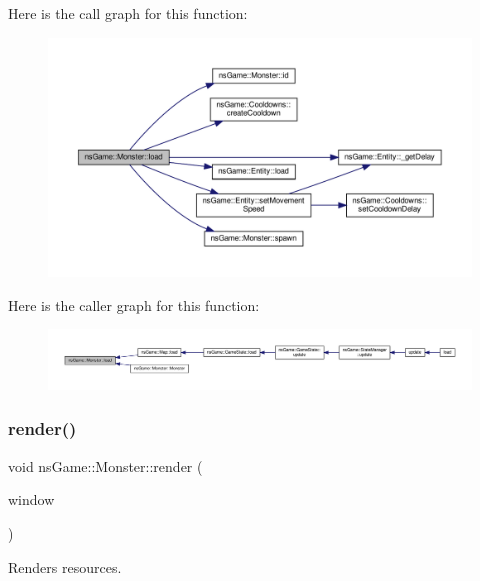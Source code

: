 Here is the call graph for this function\+:\nopagebreak
\begin{figure}[H]
\begin{center}
\leavevmode
\includegraphics[width=350pt]{classns_game_1_1_monster_a6b81ba26c3e8fae426e719be2acc4e4e_cgraph}
\end{center}
\end{figure}
Here is the caller graph for this function\+:\nopagebreak
\begin{figure}[H]
\begin{center}
\leavevmode
\includegraphics[width=350pt]{classns_game_1_1_monster_a6b81ba26c3e8fae426e719be2acc4e4e_icgraph}
\end{center}
\end{figure}
\mbox{\label{classns_game_1_1_monster_afe0b8e0d63cfef2cf0026f81facae620}} 
\subsubsection{\texorpdfstring{render()}{render()}}
{\footnotesize\ttfamily void ns\+Game\+::\+Monster\+::render (\begin{DoxyParamCaption}\item[{Min\+GL \&}]{window }\end{DoxyParamCaption})}



Renders resources. 



